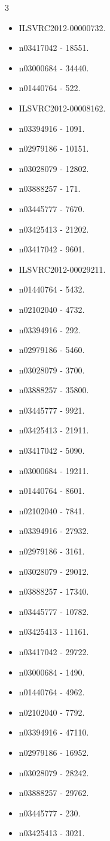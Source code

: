 \begin{multicols}{3}
\begin{itemize}
\item ILSVRC2012-00000732.
\item n03417042 - 18551.
\item n03000684 - 34440.
\item n01440764 - 522.
\item ILSVRC2012-00008162.
\item n03394916 - 1091.
\item n02979186 - 10151.
\item n03028079 - 12802.
\item n03888257 - 171.
\item n03445777 - 7670.
\item n03425413 - 21202.
\item n03417042 - 9601.
\item ILSVRC2012-00029211.
\item n01440764 - 5432.
\item n02102040 - 4732.
\item n03394916 - 292.
\item n02979186 - 5460.
\item n03028079 - 3700.
\item n03888257 - 35800.
\item n03445777 - 9921.
\item n03425413 - 21911.
\item n03417042 - 5090.
\item n03000684 - 19211.
\item n01440764 - 8601.
\item n02102040 - 7841.
\item n03394916 - 27932.
\item n02979186 - 3161.
\item n03028079 - 29012.
\item n03888257 - 17340.
\item n03445777 - 10782.
\item n03425413 - 11161.
\item n03417042 - 29722.
\item n03000684 - 1490.
\item n01440764 - 4962.
\item n02102040 - 7792.
\item n03394916 - 47110.
\item n02979186 - 16952.
\item n03028079 - 28242.
\item n03888257 - 29762.
\item n03445777 - 230.
\item n03425413 - 3021.

\end{itemize}
\end{multicols}
